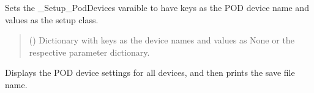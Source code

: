 \documentclass[letterpaper,10pt,english]{sphinxmanual}
\begin{document}
\begin{fulllineitems}
\begin{fulllineitems}
\end{fulllineitems}


\begin{fulllineitems}
\label{\detokenize{Setup_PodDevices:Setup_PodDevices.Setup_PodDevices._Set_Setup_PodDevices}}
\pysigstartsignatures
{}
\pysigstopsignatures
\sphinxAtStartPar
Sets the \_Setup\_PodDevices varaible to have keys as the POD device name and values         as the setup class.
\begin{quote}\begin{description}
\sphinxAtStartPar
{} (\sphinxstyleliteralemphasis{\sphinxupquote{{[}}}\sphinxstyleliteralemphasis{\sphinxupquote{,}}\sphinxstyleliteralemphasis{\sphinxupquote{ | }}\sphinxstyleliteralemphasis{\sphinxupquote{{]}}}) \textendash{} Dictionary with keys as the device names                 and values as None or the respective parameter dictionary.

\end{description}\end{quote}

\end{fulllineitems}


\begin{fulllineitems}
\label{\detokenize{Setup_PodDevices:Setup_PodDevices.Setup_PodDevices._ShowCurrentSettings}}
\pysigstartsignatures
{}
\pysigstopsignatures
\sphinxAtStartPar
Displays the POD device settings for all devices, and then prints the save file name.


\end{fulllineitems}
\end{fulllineitems}
\end{document}
